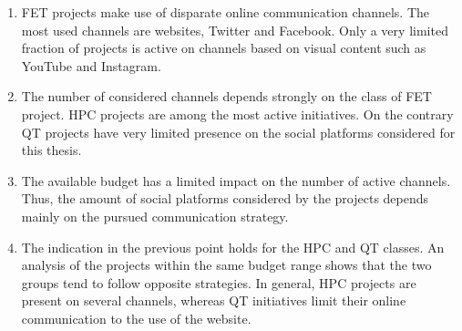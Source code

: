 \begin{enumerate}
 \item FET projects make use of disparate online communication channels. The most used channels are websites, Twitter and Facebook. Only a very limited fraction of projects is active on channels based on visual content such as YouTube and Instagram.
 \item The number of considered channels depends strongly on the class of FET project. HPC projects are among the most active initiatives. On the contrary QT projects have very limited presence on the social platforms considered for this thesis.
 \item The available budget has a limited impact on the number of active channels. Thus, the amount of social platforms considered by the projects depends mainly on the pursued communication strategy.
 \item The indication in the previous point holds for the HPC and QT classes. An analysis of the projects within the same budget range shows that the two groups tend to follow opposite strategies. In general, HPC projects are present on several channels, whereas QT initiatives limit their online communication to the use of the website.       
\end{enumerate}